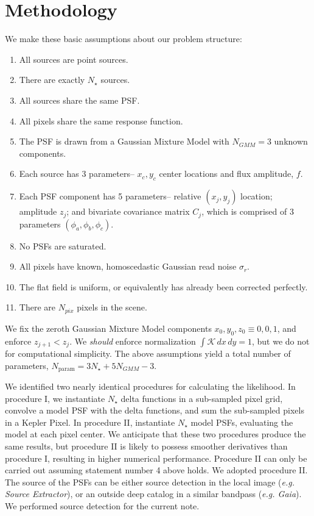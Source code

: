\documentclass{rnaastex}
\begin{document}
\section{Methodology}
We make these basic assumptions about our problem structure:

\begin{enumerate}
  \item All sources are point sources.
  \item There are exactly $N_{\star}$ sources.
  \item All sources share the same PSF.
  \item All pixels share the same response function.
  \item The PSF is drawn from a Gaussian Mixture Model with $N_{GMM} = 3$ unknown components.
  \item Each source has 3 parameters-- $x_c, y_c$ center locations and flux amplitude, $f$.
  \item Each PSF component has 5 parameters-- relative $(x_j, y_j)$ location; amplitude $z_j$; and bivariate covariance matrix $C_j$, which is comprised of 3 parameters $(\phi_a, \phi_b, \phi_c)$.
  \item No PSFs are saturated.
  \item All pixels have known, homoscedastic Gaussian read noise $\sigma_{r}$.
  \item The flat field is uniform, or equivalently has already been corrected perfectly.
  \item There are $N_{pix}$ pixels in the scene.
\end{enumerate}

We fix the zeroth Gaussian Mixture Model components $x_0,y_0, z_0 \equiv 0, 0, 1 $, and enforce $z_{j+1} < z_{j}$.  We \emph{should} enforce normalization $\int \mathcal{K} \,dx\,dy = 1$, but we do not for computational simplicity. The above assumptions yield a total number of parameters, $N_{\mathrm{param}} = 3 N_\star + 5N_{GMM} - 3$.

We identified two nearly identical procedures for calculating the likelihood.  In procedure I, we instantiate $N_\star$ delta functions in a sub-sampled pixel grid, convolve a model PSF with the delta functions, and sum the sub-sampled pixels in a Kepler Pixel.  In procedure II, instantiate $N_\star$ model PSFs, evaluating the model at each pixel center.  We anticipate that these two procedures produce the same results, but procedure II is likely to possess smoother derivatives than procedure I, resulting in higher numerical performance.  Procedure II can only be carried out assuming statement number 4 above holds.  We adopted procedure II.  The source of the PSFs can be either source detection in the local image (\emph{e.g. Source Extractor}), or an outside deep catalog in a similar bandpass (\emph{e.g. Gaia}).  We performed source detection for the current note.
\end{document}
